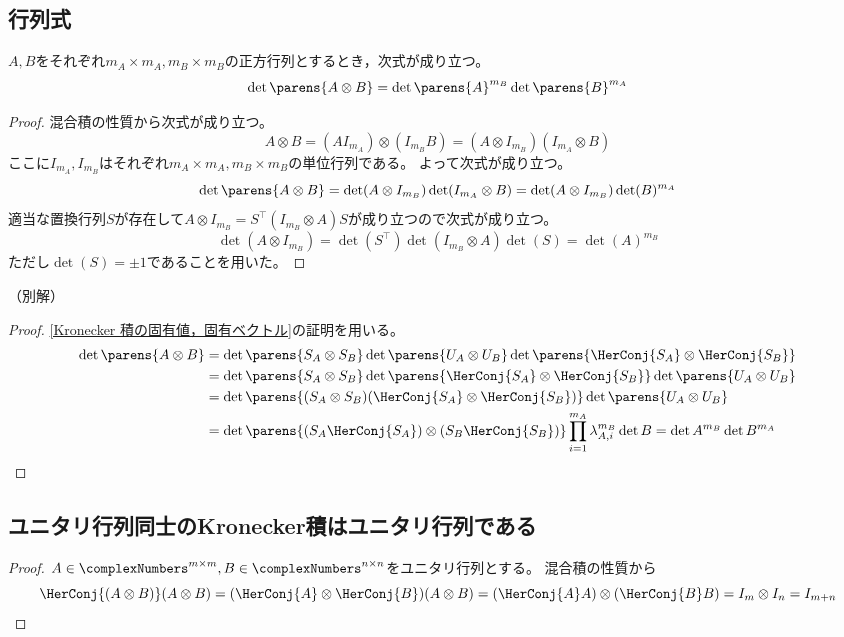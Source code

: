         \subsection{行列式}
            \begin{shadebox}
                $A,B$をそれぞれ$m_A\times m_A, m_B\times m_B$の正方行列とするとき，次式が成り立つ。
                \[ \det\parens{A\otimes B} = \det\parens{A}^{m_B}\det\parens{B}^{m_A} \]
            \end{shadebox}
            \begin{proof}
                混合積の性質から次式が成り立つ。
                \[ A\otimes B = (A I_{m_A})\otimes(I_{m_B} B) = (A\otimes I_{m_B})(I_{m_A}\otimes B) \]
                ここに$I_{m_A}, I_{m_B}$はそれぞれ$m_A\times m_A, m_B\times m_B$の単位行列である。
                よって次式が成り立つ。
                \[ \det\parens{A\otimes B} = \det(A\otimes I_{m_B})\det(I_{m_A}\otimes B) = \det(A\otimes I_{m_B})\det(B)^{m_A} \]
                適当な置換行列$S$が存在して$A\otimes I_{m_B} = S^\top(I_{m_B}\otimes A)S$が成り立つので次式が成り立つ。
                \[ \det(A\otimes I_{m_B}) = \det(S^\top)\det(I_{m_B}\otimes A)\det(S) = \det(A)^{m_B} \]
                ただし$\det(S) = \pm 1$であることを用いた。
            \end{proof}
            （別解）
            \begin{proof}
                \ref{Kronecker 積の固有値，固有ベクトル}の証明を用いる。
                \begin{align*}
                    \det\parens{A\otimes B} &= \det\parens{S_A\otimes S_B}\det\parens{U_A\otimes U_B}\det\parens{\HerConj{S_A}\otimes\HerConj{S_B}} \\
                    &= \det\parens{S_A\otimes S_B}\det\parens{\HerConj{S_A}\otimes\HerConj{S_B}}\det\parens{U_A\otimes U_B} \\
                    &= \det\parens{(S_A\otimes S_B)(\HerConj{S_A}\otimes\HerConj{S_B})}\det\parens{U_A\otimes U_B} \\
                    &= \det\parens{(S_A\HerConj{S_A})\otimes(S_B\HerConj{S_B})}\prod_{i=1}^{m_A} \lambda_{A,i}^{m_B}\det{B} = \det{A}^{m_B}\det{B}^{m_A}
                \end{align*}
            \end{proof}
        \subsection{ユニタリ行列同士のKronecker積はユニタリ行列である}
            \begin{proof}
                $A\in\complexNumbers^{m\times m}, B\in\complexNumbers^{n\times n}$をユニタリ行列とする。
                混合積の性質から
                \[
                    \HerConj{(A\otimes B)}(A\otimes B) = (\HerConj{A}\otimes \HerConj{B})(A\otimes B) = (\HerConj{A}A)\otimes(\HerConj{B}B) = I_m\otimes I_n = I_{m+n}
                \]
            \end{proof}